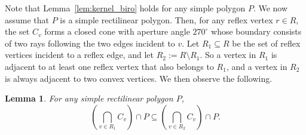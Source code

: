 \documentclass[11pt]{article}
\newtheorem{lemma}{Lemma}
\theoremstyle{definition}
\begin{document}
Note that Lemma~\ref{lem:kernel_biro} holds for any simple polygon $P$.
We now assume that $P$ is a simple rectilinear polygon.
Then, for any reflex vertex $r\in R$, the set $C_v$ forms a closed cone with aperture angle $270^\circ$
whose boundary consists of two rays following the two edges incident to $v$.
Let $R_1 \subseteq R$ be the set of reflex vertices incident to a reflex edge,
and let $R_2 := R \setminus R_1$.
So a vertex in $R_1$ is adjacent to at least one reflex vertex that also belongs to $R_1$,
and a vertex in $R_2$ is always adjacent to two convex vertices.
We then observe the following.
\begin{lemma}
\label{lem:kernel_lem}
For any simple rectilinear polygon $P$,
\[ \left( \bigcap_{v\in R_1}C_v \right) \cap P  \subseteq  \left( \bigcap_{v\in R_2}C_v \right) \cap P.\]
\end{lemma}
\end{document}
